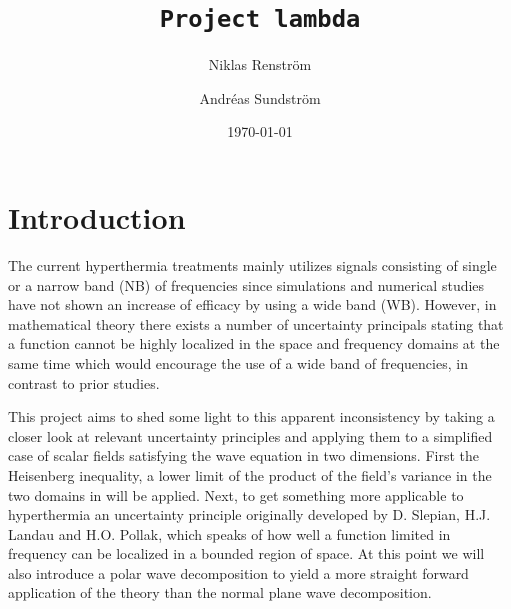 \documentclass[11pt,a4paper, 
swedish,english %
]{article}
\begin{document}


%


\begin{titlepage}
\title{\tt Project lambda}
\author{Niklas Renström \and Andréas Sundström}
\date{\today}

\maketitle

\thispagestyle{empty} \pagestyle{empty} %

\begin{abstract} 


\end{abstract}
\newpage
\tableofcontents
\end{titlepage}

\setcounter{page}{1}


\section{Introduction}

The current hyperthermia treatments mainly utilizes signals consisting of single or a narrow band (NB) of frequencies since simulations and numerical studies have not shown an increase of efficacy by using a wide band (WB). 
However, in mathematical theory there exists a number of uncertainty  principals stating that a function cannot be highly localized in the space and frequency domains at the same time which would encourage the use of a wide band of frequencies, in contrast to prior studies.

This project aims to shed some light to this apparent inconsistency by taking a closer look at relevant uncertainty principles and applying them to a simplified case of scalar fields satisfying the wave equation in two dimensions.
First the Heisenberg inequality, a lower limit of the product of the field's variance in the two domains in  will be applied.
Next, to get something more applicable to hyperthermia an uncertainty principle originally developed by D. Slepian, H.J. Landau and H.O. Pollak, which speaks of how well a function limited in frequency can be localized in a bounded region of space. At this point we will also introduce a polar wave decomposition to yield a more straight forward application of the theory than the normal plane wave decomposition.
\end{document}
